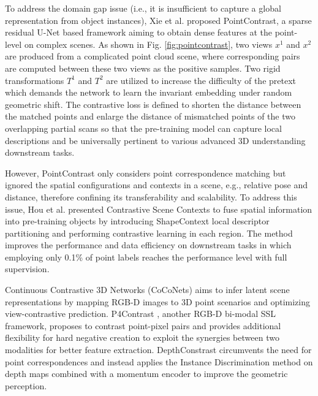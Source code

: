\documentclass[a4paper,fleqn]{cas-dc}
\begin{document}
To address the domain gap issue (i.e., it is insufficient to capture a global representation from object instances), Xie et al. \citep{xie2020pointcontrast} proposed PointContrast, a sparse residual U-Net based framework aiming to obtain dense features at the point-level on complex scenes. As shown in Fig. \ref{fig:pointcontrast}, two views $x^1$ and $x^2$ are produced from a complicated point cloud scene, where corresponding pairs are computed between these two views as the positive samples. Two rigid transformations $T^1$ and $T^2$ are utilized to increase the difficulty of the pretext which demands the network to learn the invariant embedding under random geometric shift. The contrastive loss is defined to shorten the distance between the matched points and enlarge the distance of mismatched points of the two overlapping partial scans so that the pre-training model can capture local descriptions and be universally pertinent to various advanced 3D understanding downstream tasks.

However, PointContrast only considers point correspondence matching but ignored the spatial configurations and contexts in a scene, e.g., relative pose and distance, therefore confining its transferability and scalability. To address this issue, Hou et al. \citep{hou2021exploring} presented Contrastive Scene Contexts to fuse spatial information into pre-training objects by introducing ShapeContext local descriptor \citep{xie2018attentional} partitioning and performing contrastive learning in each region. The method improves the performance and data efficiency on downstream tasks in which employing only 0.1\% of point labels reaches the performance level with full supervision.

Continuous Contrastive 3D Networks (CoCoNets) \citep{lal2021coconets} aims to infer latent scene representations by mapping RGB-D images to 3D point scenarios and optimizing view-contrastive prediction. P4Contrast \citep{2020arXiv201213089L}, another RGB-D bi-modal SSL framework, proposes to contrast point-pixel pairs and provides additional flexibility for hard negative creation to exploit the synergies between two modalities for better feature extraction. DepthConstrast \citep{zhang2021self} circumvents the need for point correspondences and instead applies the Instance Discrimination \citep{wu2018unsupervised} method on depth maps combined with a momentum encoder to improve the geometric perception.
\end{document}
